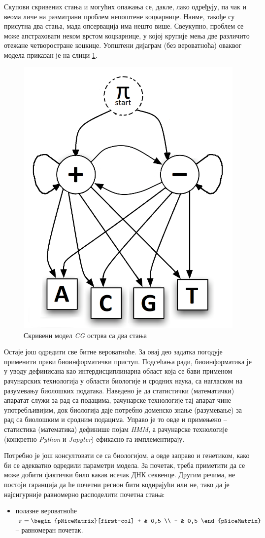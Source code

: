 \documentclass[12pt,oneside]{memoir}
\begin{document}
\begin{CJK}{UTF8}{ipxm}
Скупови скривених стања и могућих опажања се, дакле, лако одређују, па чак и веома личе на разматрани проблем непоштене коцкарнице. Наиме, такође су присутна два стања, мада опсервација има нешто више. Свеукупно, проблем се може апстраховати неком врстом коцкарнице, у којој крупије мења две различито отежане четворостране коцкице. Уопштени дијаграм (без вероватноћа) оваквог модела приказан је на слици \ref{fig:cg_graf}.

\begin{figure}[H]
  \centering
  \includegraphics[width=.5\textwidth]{cg_graf.png}
  \caption{Скривени модел \textit{CG} острва са два стања}
  \label{fig:cg_graf}
\end{figure}

Остаје још одредити све битне вероватноће. За овај део задатка погодује применити прави биоинформатички приступ. Подсећања ради, биоинформатика је у уводу дефинисана као интердисциплинарна област која се бави применом рачунарских технологија у области биологије и сродних наука, са нагласком на разумевању биолошких података. Наведено је да статистички (математички) апаратат служи за рад са подацима, рачунарске технологије тај апарат чине употребљивијим, док биологија даје потребно доменско знање (разумевање) за рад са биолошким и сродним подацима. Управо је то овде и примењено -- статистика (математика) дефинише појам \textit{HMM}, а рачунарске технологије (конкретно \textit{Python} и \textit{Jupyter}) ефикасно га имплементирају.

Потребно је још консултовати се са биологијом, а овде заправо и генетиком, како би се адекватно одредили параметри модела. За почетак, треба приметити да се може добити фактички било какав исечак ДНК секвенце. Другим речима, не постоји гаранција да ће почетни регион бити кодирајући или не, тако да је најсигурније равномерно расподелити почетна стања:
\begin{itemize}
  \item полазне вероватноће $\pi = \begin{pNiceMatrix}[first-col] + & 0,5 \\ - & 0,5 \end{pNiceMatrix}$ -- равномеран почетак.
\end{itemize}


\end{CJK}
\end{document}
